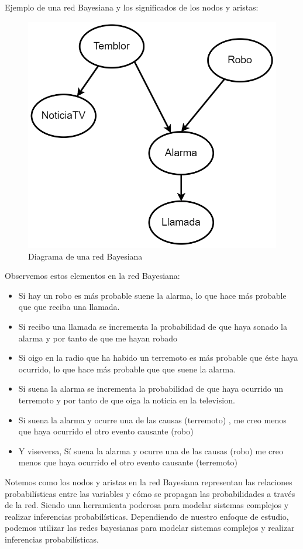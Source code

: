 Ejemplo de una red Bayesiana y los significados de los nodos y aristas:

\begin{figure}[H]
    \centering
    \includegraphics[width=0.35\linewidth]{IMA/RedesBayes.png} 
    \caption{Diagrama de una red Bayesiana} 
\end{figure}

Observemos estos elementos en la red Bayesiana:

\begin{itemize}
    \item Si hay un robo es más probable
    suene la alarma, lo que hace más probable que que reciba una llamada.
    
    \item Si recibo una llamada se incrementa
    la probabilidad de que haya sonado la alarma y por tanto de que me
    hayan robado
    
    \item Si oigo en la radio que ha habido un
    terremoto es más probable que éste haya ocurrido, lo que hace más
    probable que que suene la alarma.
    
    \item Si suena la alarma se incrementa la
    probabilidad de que haya ocurrido un terremoto y por tanto de que
    oiga la noticia en la television.
    
    \item Si suena la alarma y ocurre una de
    las causas (terremoto) , me creo menos que haya ocurrido el otro evento causante (robo)	
    
    \item Y viseversa, Sí suena la alarma y ocurre una de
    las causas (robo) me creo menos que haya ocurrido el otro evento causante (terremoto)
\end{itemize}

Notemos como los nodos y aristas en la red Bayesiana representan las relaciones probabilísticas entre las variables y cómo se propagan las probabilidades a través de la red. Siendo una herramienta poderosa para modelar sistemas complejos y realizar inferencias probabilísticas.
Dependiendo de nuestro enfoque de estudio, podemos utilizar las redes bayesianas para modelar sistemas complejos y realizar inferencias probabilísticas.\\ 

